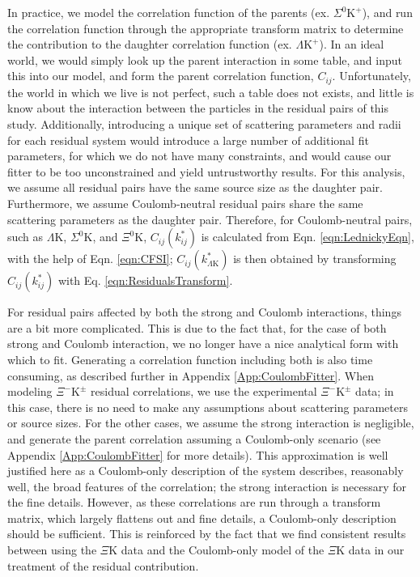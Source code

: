 \documentclass[ALICE,manyauthors]{cernphprep}
\newcommand{\KchP}{$\mathrm{K^{+}}$\xspace}
\newcommand{\LamK}{$\Lambda$K\xspace}
\newcommand{\LamKchP}{$\Lambda\mathrm{K^{+}}$\xspace}
\newcommand{\XiKpm}{$\Xi^{-}\mathrm{K^{\pm}}$\xspace}
\begin{document}
In practice, we model the correlation function of the parents (ex. $\Sigma^{0}$\KchP), and run the correlation function through the appropriate transform matrix to determine the contribution to the daughter correlation function (ex. \LamKchP).  
In an ideal world, we would simply look up the parent interaction in some table, and input this into our model, and form the parent correlation function, $C_{ij}$.  
Unfortunately, the world in which we live is not perfect, such a table does not exists, and little is know about the interaction between the particles in the residual pairs of this study. 
Additionally, introducing a unique set of scattering parameters and radii for each residual system would introduce a large number of additional fit parameters, for which we do not have many constraints, and would cause our fitter to be too unconstrained and yield untrustworthy results. 
For this analysis, we assume all residual pairs have the same source size as the daughter pair.
Furthermore, we assume Coulomb-neutral residual pairs share the same scattering parameters as the daughter pair.
Therefore, for Coulomb-neutral pairs, such as \LamK, $\Sigma^{0}$K, and $\Xi^{0}$K, $C_{ij}(k^{*}_{ij})$ is calculated from Eqn. \ref{eqn:LednickyEqn}, with the help of Eqn. \ref{eqn:CFSI}; $C_{ij}(k^{*}_{\Lambda\mathrm{K}})$ is then obtained by transforming $C_{ij}(k^{*}_{ij})$ with Eq. \ref{eqn:ResidualsTransform}.  

For residual pairs affected by both the strong and Coulomb interactions, things are a bit more complicated.
This is due to the fact that, for the case of both strong and Coulomb interaction, we no longer have a nice analytical form with which to fit.
Generating a correlation function including both is also time consuming, as described further in Appendix \ref{App:CoulombFitter}.
When modeling \XiKpm residual correlations, we use the experimental \XiKpm data; in this case, there is no need to make any assumptions about scattering parameters or source sizes. 
For the other cases, we assume the strong interaction is negligible, and generate the parent correlation assuming a Coulomb-only scenario (see Appendix \ref{App:CoulombFitter} for more details).
This approximation is well justified here as a Coulomb-only description of the system describes, reasonably well, the broad features of the correlation; the strong interaction is necessary for the fine details.  
However, as these correlations are run through a transform matrix, which largely flattens out and fine details, a Coulomb-only description should be sufficient.  
This is reinforced by the fact that we find consistent results between using the $\Xi$K data and the Coulomb-only model of the $\Xi$K data in our treatment of the residual contribution.  
\end{document}
